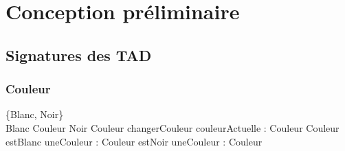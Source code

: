 		
		\section{Conception préliminaire}
			\subsection{Signatures des TAD}
				\subsubsection{Couleur}
				\begin{algorithme}
				 \{Blanc, Noir\}
				\\
				\signaturefonction 
				{Blanc}
				{}
				{Couleur}
				\signaturefonction 
				{Noir}
				{}
				{Couleur}
				\signaturefonction
				{changerCouleur}
				{couleurActuelle : Couleur}
				{Couleur}
				\signaturefonction
				{estBlanc}
				{uneCouleur : Couleur}
				{\booleen}
				\signaturefonction
				{estNoir}
				{uneCouleur : Couleur}
				{\booleen}
				\end{algorithme}
